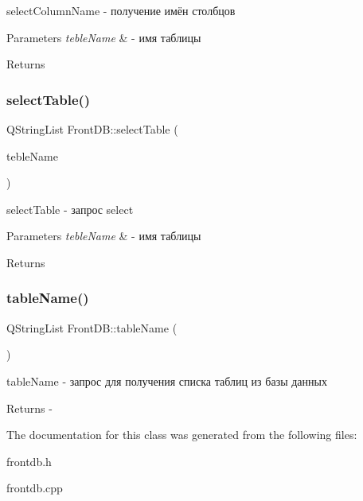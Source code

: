 select\+Column\+Name -\/ получение имён столбцов 


\begin{DoxyParams}{Parameters}
{\em teble\+Name} & -\/ имя таблицы \\
\hline
\end{DoxyParams}
\begin{DoxyReturn}{Returns}

\end{DoxyReturn}
\mbox{\label{classFrontDB_a310f18bfa2665bd435834982f32b8b43}} 
\subsubsection{\texorpdfstring{select\+Table()}{selectTable()}}
{\footnotesize\ttfamily Q\+String\+List Front\+D\+B\+::select\+Table (\begin{DoxyParamCaption}\item[{const Q\+String \&}]{teble\+Name }\end{DoxyParamCaption})}



select\+Table -\/ запрос select 


\begin{DoxyParams}{Parameters}
{\em teble\+Name} & -\/ имя таблицы \\
\hline
\end{DoxyParams}
\begin{DoxyReturn}{Returns}

\end{DoxyReturn}
\mbox{\label{classFrontDB_aa5cc2999b6731290015b11908b58d8da}} 
\subsubsection{\texorpdfstring{table\+Name()}{tableName()}}
{\footnotesize\ttfamily Q\+String\+List Front\+D\+B\+::table\+Name (\begin{DoxyParamCaption}{ }\end{DoxyParamCaption})}



table\+Name -\/ запрос для получения списка таблиц из базы данных 

\begin{DoxyReturn}{Returns}
-\/ 
\end{DoxyReturn}


The documentation for this class was generated from the following files\+:\begin{DoxyCompactItemize}
\item 
frontdb.\+h\item 
frontdb.\+cpp\end{DoxyCompactItemize}
